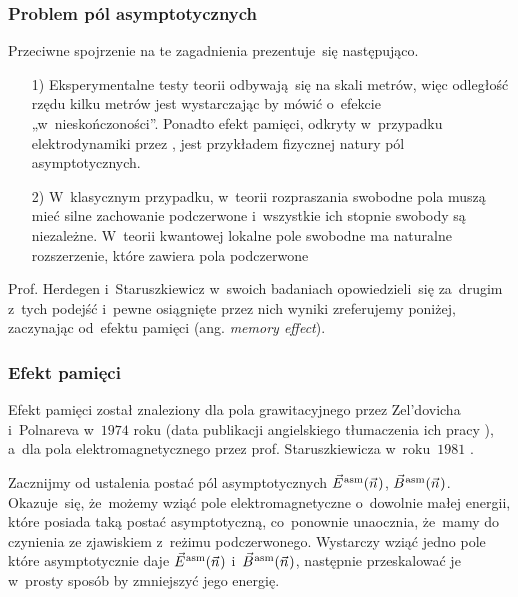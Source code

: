 \documentclass[10pt,t]{beamer}
\begin{document}
\begin{frame}
  \frametitle{Problem pól asymptotycznych}


  Przeciwne spojrzenie na te zagadnienia prezentuje~się następująco.

  \begin{itemize}

  \item[1)] Eksperymentalne testy teorii odbywają~się na skali metrów,
    więc odległość rzędu kilku metrów jest wystarczając by mówić o~efekcie
    „w~nieskończoności”. Ponadto efekt pamięci, odkryty w~przypadku
    elektrodynamiki przez
    ,
    jest przykładem fizycznej natury pól asymptotycznych.

  \item[2)] W~klasycznym przypadku, w~teorii rozpraszania swobodne pola
    muszą mieć silne zachowanie podczerwone i~wszystkie ich stopnie swobody
    są niezależne. W~teorii kwantowej lokalne pole swobodne ma naturalne
    rozszerzenie, które zawiera pola podczerwone

  \end{itemize}

  Prof. Herdegen i~Staruszkiewicz w~swoich badaniach opowiedzieli~się
  za~drugim z~tych podejść i~pewne osiągnięte przez nich wyniki zreferujemy
  poniżej, zaczynając od~efektu pamięci (ang. \textit{memory effect}).

  \end{frame}





\begin{frame}
  \frametitle{Efekt pamięci}


  Efekt pamięci został znaleziony dla pola grawitacyjnego przez
  Zel'dovicha i~Polnareva w~$1974$ roku (data publikacji angielskiego
  tłumaczenia ich pracy
  \parencite{Zeldovich-Polnarev-Radiation-of-gravitational-ETC-Pub-1974}),
  a~dla pola elektromagnetycznego przez prof. Staruszkiewicza w~roku~$1981$
  \parencite{Staruszkiewicz-Gauge-invariant-surface-contribution-ETC-Pub-1981}.

  Zacznijmy od ustalenia postać pól asymptotycznych $\vec{E}^{ \hspace{0.05em} \text{asm} }( \vec{n} \hspace{0.05em} )$,
  $\vec{B}^{ \hspace{0.05em} \text{asm} }( \vec{n} \hspace{0.05em} )$. Okazuje~się, że~możemy wziąć pole elektromagnetyczne
  o~dowolnie małej energii, które posiada taką postać asymptotyczną,
  co~ponownie unaocznia, że~mamy do czynienia ze zjawiskiem z~reżimu
  podczerwonego. Wystarczy wziąć jedno pole które asymptotycznie daje
  $\vec{E}^{ \hspace{0.05em} \text{asm} }( \vec{n} \hspace{0.05em} )$ i~$\vec{B}^{ \hspace{0.05em} \text{asm} }( \vec{n} \hspace{0.05em} )$, następnie przeskalować je w~prosty sposób
  by zmniejszyć jego energię.

\end{frame}
\end{document}
